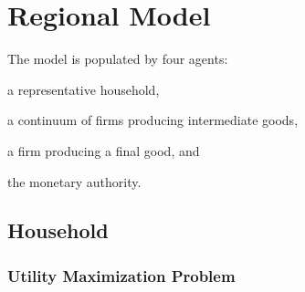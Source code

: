 \documentclass[
	thesis.tex
	]{subfiles}
\begin{document}
\newpage


\section*{Regional Model}\label{sec:regional-model}


The model is populated by four agents: 
\begin{enumerate*}[label=(\arabic*)]
	\item a representative household,
	\item a continuum of firms producing intermediate goods,
	\item a firm producing a final good, and
	\item the monetary authority.
\end{enumerate*}


\subsection{Household}

\subsubsection*{Utility Maximization Problem}
\end{document}
